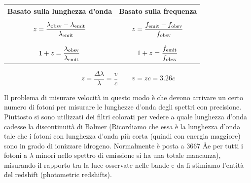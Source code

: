 
\begin{center}
    \begin{tabular}{|c|c|}
        \hline
        Basato sulla lunghezza d'onda & Basato sulla frequenza\\
        \hline
        &\\[-0.4cm]
        $\displaystyle z=\rm \frac{\lambda_{obsv} - \lambda_{emit}}{\lambda_{emit}}$ & $\displaystyle z=\frac{f_{\rm emit} - f_{\rm obsv}}{f_{\rm obsv}}$\\
        &\\[-0.4cm]
        \hline
        &\\[-0.4cm]
        $\displaystyle 1 + z=\rm \frac{\lambda_{obsv}}{\lambda_{emit}}$ & $\displaystyle 1+z=\frac{f_{\rm emit}}{f_{\rm obsv}}$\\[0.3cm]
        \hline
    \end{tabular}
\end{center}

$$z=\frac{\Delta \lambda}{\lambda}=\frac{v}{c}
\qquad
v=zc=3.26c$$

Il problema di misurare velocità in questo modo è che devono arrivare un certo numero di fotoni per misurare le lunghezze d'onda degli spettri con precisione.
Piuttosto si sono utilizzati dei filtri colorati per vedere a quale lunghezza d'onda cadesse la discontinuità di Balmer (Ricordiamo che essa è la lunghezza d'onda tale che i fotoni con lunghezza d'onda più corta (quindi con energia maggiore) sono in grado di ionizzare idrogeno. Normalmente è posta a 3667 \AA e per tutti i fotoni a $\lambda$ minori nello spettro di emissione si ha una totale mancanza), misurando il rapporto tra la luce osservate nelle bande e da lì stimiamo l'entità del redshift (photometric redshifts).

